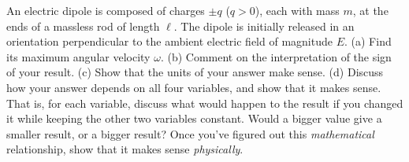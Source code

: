 An electric dipole is composed of charges $\pm q$ ($q>0$), each with mass $m$,
at the ends of a massless rod of length $\ell$. The dipole is initially
released in an orientation perpendicular to the ambient electric field
of magnitude $E$. (a) Find its maximum angular velocity $\omega$.\answercheck\hwendpart
(b) Comment on the interpretation of the sign of your result.\hwendpart
(c) Show that the units of your answer make sense.\hwendpart
(d) Discuss how your answer depends on all four
variables, and show that it makes sense. That is, for each
variable, discuss what would happen to the result if you
changed it while keeping the other two variables constant.
Would a bigger value give a smaller result, or a bigger
result? Once you've figured out this \emph{mathematical}
relationship, show that it makes sense \emph{physically}.\hwendpart
